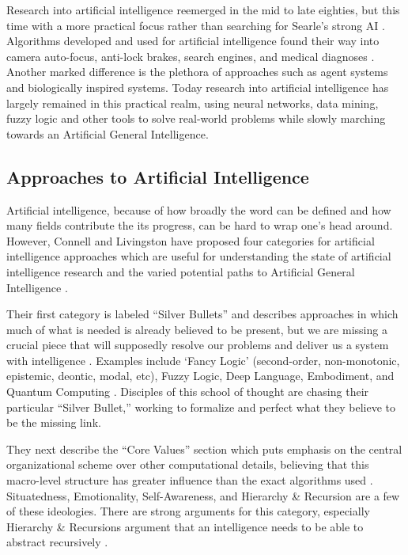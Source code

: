 \documentclass[fleqn,notitlepage,minimal]{article}
\begin{document}
	Research into artificial intelligence reemerged in the mid to late eighties, but this time with a more practical focus rather than searching for Searle's strong AI \cite{Jones}. Algorithms developed and used for artificial intelligence found their way into camera auto-focus, anti-lock brakes, search engines, and medical diagnoses \cite{Jones}. Another marked difference is the plethora of approaches such as agent systems and biologically inspired systems. Today research into artificial intelligence has largely remained in this practical realm, using neural networks, data mining, fuzzy logic and other tools to solve real-world problems while slowly marching towards an Artificial General Intelligence.
	
	\subsection{Approaches to Artificial Intelligence}
	
	Artificial intelligence, because of how broadly the word can be defined and how many fields contribute the its progress, can be hard to wrap one's head around. However, Connell and Livingston have proposed four categories for artificial intelligence approaches which are useful for understanding the state of artificial intelligence research and the varied potential paths to Artificial General Intelligence \cite{Connell}.
	
	Their first category is labeled ``Silver Bullets'' and describes approaches in which much of what is needed is already believed to be present, but we are missing a crucial piece that will supposedly resolve our problems and deliver us a system with intelligence \cite{Connell}. Examples include `Fancy Logic' (second-order, non-monotonic, epistemic, deontic, modal, etc), Fuzzy Logic, Deep Language, Embodiment, and Quantum Computing \cite{Connell}. Disciples of this school of thought are chasing their particular ``Silver Bullet,'' working to formalize and perfect what they believe to be the missing link.
	
	They next describe the ``Core Values'' section which puts emphasis on the central organizational scheme over other computational details, believing that this macro-level structure has greater influence than the exact algorithms used \cite{Connell}. Situatedness, Emotionality, Self-Awareness, and Hierarchy \& Recursion are a few of these ideologies. There are strong arguments for this category, especially Hierarchy \& Recursions argument that an intelligence needs to be able to abstract recursively \cite{Connell}.
	
\end{document}
